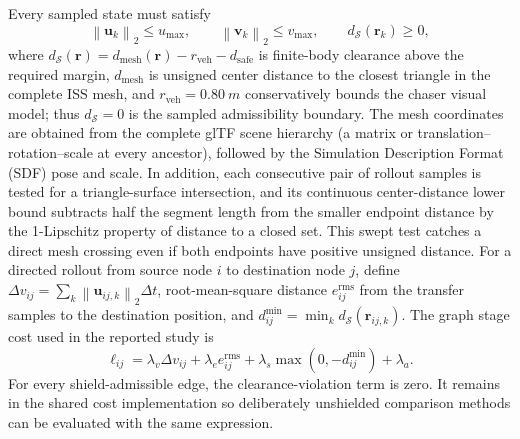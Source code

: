\documentclass{IEEEtaes}
\newcommand{\dt}{\Delta t}
\newcommand{\norm}[1]{\left\lVert #1 \right\rVert}
\newcommand{\unit}[2]{#1~#2}
\theoremstyle{remark}
\theoremstyle{plain}
\begin{document}
Every sampled state must satisfy
\begin{equation}
  \norm{\mathbf u_k}_2\le u_{\max},\qquad
  \norm{\mathbf v_k}_2\le v_{\max},\qquad
  d_{\mathcal S}(\mathbf r_k)\ge 0,
  \label{eq:limits}
\end{equation}
where $d_{\mathcal S}(\mathbf r)=d_{\mathrm{mesh}}(\mathbf r)-r_{\mathrm{veh}}-d_{\mathrm{safe}}$ is finite-body clearance above the required margin, $d_{\mathrm{mesh}}$ is unsigned center distance to the closest triangle in the complete ISS mesh, and $r_{\mathrm{veh}}=\unit{0.80}{m}$ conservatively bounds the chaser visual model; thus $d_{\mathcal S}=0$ is the sampled admissibility boundary. The mesh coordinates are obtained from the complete glTF scene hierarchy (a matrix or translation--rotation--scale at every ancestor), followed by the Simulation Description Format (SDF) pose and scale. In addition, each consecutive pair of rollout samples is tested for a triangle-surface intersection, and its continuous center-distance lower bound subtracts half the segment length from the smaller endpoint distance by the 1-Lipschitz property of distance to a closed set. This swept test catches a direct mesh crossing even if both endpoints have positive unsigned distance. For a directed rollout from source node $i$ to destination node $j$, define $\Delta v_{ij}=\sum_k\norm{\mathbf u_{ij,k}}_2\dt$, root-mean-square distance $e_{ij}^{\mathrm{rms}}$ from the transfer samples to the destination position, and $d_{ij}^{\min}=\min_k d_{\mathcal S}(\mathbf r_{ij,k})$. The graph stage cost used in the reported study is
\begin{equation}
  \ell_{ij}=\lambda_v\Delta v_{ij}+\lambda_e e_{ij}^{\mathrm{rms}}+\lambda_s\max(0,-d_{ij}^{\min})+\lambda_a.
  \label{eq:edge-cost}
\end{equation}
For every shield-admissible edge, the clearance-violation term is zero. It remains in the shared cost implementation so deliberately unshielded comparison methods can be evaluated with the same expression.
\end{document}
